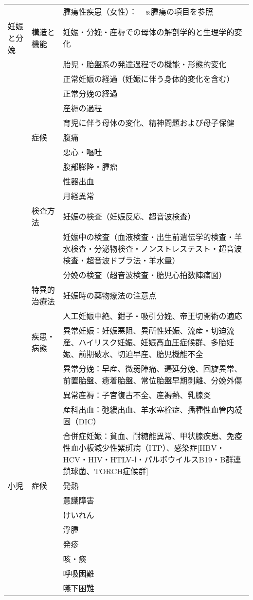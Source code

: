 \begin{xltabular}{\linewidth}{XXX}
 &  & 腫瘍性疾患（女性）：　※腫瘍の項目を参照 \\
妊娠と分娩 & 構造と機能 & 妊娠・分娩・産褥での母体の解剖学的と生理学的変化 \\
 &  & 胎児・胎盤系の発達過程での機能・形態的変化 \\
 &  & 正常妊娠の経過（妊娠に伴う身体的変化を含む） \\
 &  & 正常分娩の経過 \\
 &  & 産褥の過程 \\
 &  & 育児に伴う母体の変化、精神問題および母子保健 \\
 & 症候 & 腹痛 \\
 &  & 悪心・嘔吐 \\
 &  & 腹部膨隆・腫瘤 \\
 &  & 性器出血 \\
 &  & 月経異常 \\
 & 検査方法 & 妊娠の検査（妊娠反応、超音波検査） \\
 &  & 妊娠中の検査（血液検査・出生前遺伝学的検査・羊水検査・分泌物検査・ノンストレステスト・超音波検査・超音波ドプラ法・羊水量） \\
 &  & 分娩の検査（超音波検査・胎児心拍数陣痛図） \\
 & 特異的治療法 & 妊娠時の薬物療法の注意点 \\
 &  & 人工妊娠中絶、鉗子・吸引分娩、帝王切開術の適応 \\
 & 疾患・病態 & 異常妊娠：妊娠悪阻、異所性妊娠、流産・切迫流産、ハイリスク妊娠、妊娠高血圧症候群、多胎妊娠、前期破水、切迫早産、胎児機能不全 \\
 &  & 異常分娩：早産、微弱陣痛、遷延分娩、回旋異常、前置胎盤、癒着胎盤、常位胎盤早期剥離、分娩外傷 \\
 &  & 異常産褥：子宮復古不全、産褥熱、乳腺炎 \\
 &  & 産科出血：弛緩出血、羊水塞栓症、播種性血管内凝固（DIC） \\
 &  & 合併症妊娠：貧血、耐糖能異常、甲状腺疾患、免疫性血小板減少性紫斑病（ITP）、感染症[HBV・HCV・HIV・HTLV-Ⅰ・パルボウイルスB19・B群連鎖球菌、TORCH症候群] \\
小児 & 症候 & 発熱 \\
 &  & 意識障害 \\
 &  & けいれん \\
 &  & 浮腫 \\
 &  & 発疹 \\
 &  & 咳・痰 \\
 &  & 呼吸困難 \\
 &  & 嚥下困難 \\

\end{xltabular}
